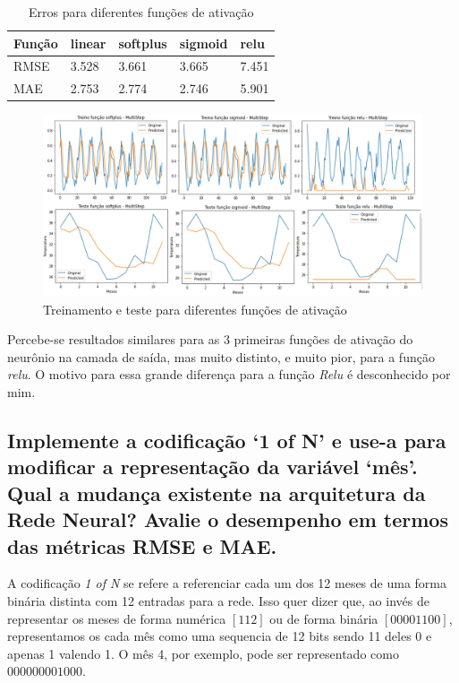 \documentclass[12pt]{article}
\begin{document}
	\begin{table}[H]
		\centering
		\begin{tabular}{|l|l|l|l|l|}
			\hline
			Função & linear & softplus & sigmoid & relu  \\ \hline
			RMSE   & 3.528  & 3.661    & 3.665   & 7.451 \\ \hline
			MAE    & 2.753  & 2.774    & 2.746   & 5.901 \\ \hline
		\end{tabular}
		\caption{Erros para diferentes funções de ativação}
	\end{table}

	\begin{figure}[H]
		\centering
		\includegraphics[width=0.9\linewidth]{Imagens/topologias/InkedfuncoesAtivacao_LI}
		\caption{Treinamento e teste para diferentes funções de ativação}
		\label{fig:inkedfuncoesativacaoli}
	\end{figure}
	
	Percebe-se resultados similares para as 3 primeiras funções de ativação do neurônio na camada de saída, mas muito distinto, e muito pior, para a função \textit{relu}. O motivo para essa grande diferença para a função \textit{Relu} é desconhecido por mim.
	
	\subsection{Implemente a codificação ‘1 of N’ e use-a para modificar a representação da variável ‘mês’. Qual a mudança existente na arquitetura da Rede	Neural? Avalie o desempenho em termos das métricas RMSE e MAE.}
	
	A codificação \textit{1 of N} se refere a referenciar cada um dos 12 meses de uma forma binária distinta com 12 entradas para a rede. Isso quer dizer que, ao invés de representar os meses de forma numérica $[1 12]$ ou de forma binária $[0000 1100]$, representamos os cada mês como uma sequencia de 12 bits sendo 11 deles 0 e apenas 1 valendo 1. O mês 4, por exemplo, pode ser representado como $000000001000$.
	
\end{document}
